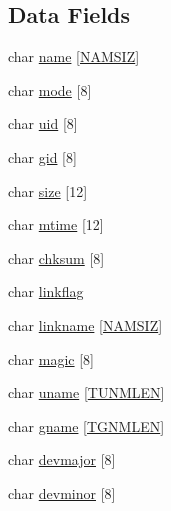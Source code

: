 \subsection*{Data Fields}
\begin{DoxyCompactItemize}
\item 
char \hyperlink{structrecord_1_1header_a6464ab86c46743a07ba86fcce20da2e2}{name} \mbox{[}\hyperlink{mod__mime__magic_8c_ac6201487e61283a3b0e4246ceac9a6a5}{N\+A\+M\+S\+IZ}\mbox{]}
\item 
char \hyperlink{structrecord_1_1header_ae0e81f7e78bc89eb51e9c7973581854b}{mode} \mbox{[}8\mbox{]}
\item 
char \hyperlink{structrecord_1_1header_a0ad15e1e942ab808e0f89496101bdf66}{uid} \mbox{[}8\mbox{]}
\item 
char \hyperlink{structrecord_1_1header_a5252bee0fa5cf1e25a703c01720160ea}{gid} \mbox{[}8\mbox{]}
\item 
char \hyperlink{structrecord_1_1header_a0f456cc2ddc79396e2d5b5e7bd63f54a}{size} \mbox{[}12\mbox{]}
\item 
char \hyperlink{structrecord_1_1header_afccb6dfedf03b79872d4776789c32dd1}{mtime} \mbox{[}12\mbox{]}
\item 
char \hyperlink{structrecord_1_1header_a049b652c8fdd28274b2362f2e8332956}{chksum} \mbox{[}8\mbox{]}
\item 
char \hyperlink{structrecord_1_1header_ab1c870ab1cb3bc4efff62b750e7e81e3}{linkflag}
\item 
char \hyperlink{structrecord_1_1header_a13ae85dd276f2c8f8d1114bd77a10f6a}{linkname} \mbox{[}\hyperlink{mod__mime__magic_8c_ac6201487e61283a3b0e4246ceac9a6a5}{N\+A\+M\+S\+IZ}\mbox{]}
\item 
char \hyperlink{structrecord_1_1header_a0d7bd5bcc35f84adcc34cf301ebccc61}{magic} \mbox{[}8\mbox{]}
\item 
char \hyperlink{structrecord_1_1header_ad5c2117db7732b21eeb1f0a2e838d725}{uname} \mbox{[}\hyperlink{mod__mime__magic_8c_a9de3571f1e3cf04a66c9cda2a93b6b17}{T\+U\+N\+M\+L\+EN}\mbox{]}
\item 
char \hyperlink{structrecord_1_1header_a5c279e9f14f00117650dc0d7201b7a69}{gname} \mbox{[}\hyperlink{mod__mime__magic_8c_aa0c246aa61b8c8be82021a61abbeca80}{T\+G\+N\+M\+L\+EN}\mbox{]}
\item 
char \hyperlink{structrecord_1_1header_a80daf75006f3a519d075dbf2303ed72b}{devmajor} \mbox{[}8\mbox{]}
\item 
char \hyperlink{structrecord_1_1header_aacd637907fc75e1719b69f7effb95725}{devminor} \mbox{[}8\mbox{]}
\end{DoxyCompactItemize}


